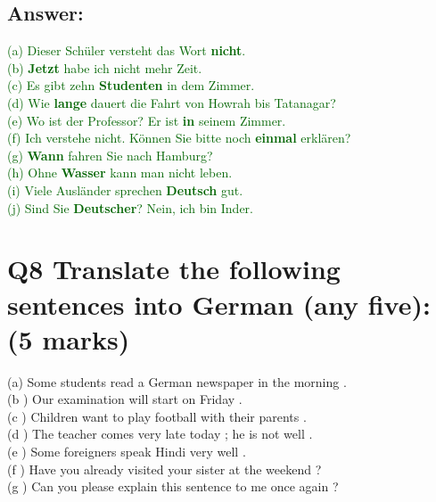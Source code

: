 \documentclass[a4paper,12pt]{article}
\begin{document}
\subsection*{Answer:}
\textcolor{darkgreen}{(a) Dieser Schüler versteht das Wort \textbf{nicht}.}\\
\textcolor{darkgreen}{(b) \textbf{Jetzt} habe ich nicht mehr Zeit.}\\
\textcolor{darkgreen}{(c) Es gibt zehn \textbf{Studenten} in dem Zimmer.}\\
\textcolor{darkgreen}{(d) Wie \textbf{lange} dauert die Fahrt von Howrah bis Tatanagar?}\\
\textcolor{darkgreen}{(e) Wo ist der Professor? Er ist \textbf{in} seinem Zimmer.}\\
\textcolor{darkgreen}{(f) Ich verstehe nicht. Können Sie bitte noch \textbf{einmal} erklären?}\\
\textcolor{darkgreen}{(g) \textbf{Wann} fahren Sie nach Hamburg?}\\
\textcolor{darkgreen}{(h) Ohne \textbf{Wasser} kann man nicht leben.}\\
\textcolor{darkgreen}{(i) Viele Ausländer sprechen \textbf{Deutsch} gut.}\\
\textcolor{darkgreen}{(j) Sind Sie \textbf{Deutscher}? Nein, ich bin Inder.}\\

\vspace{0.5cm}

\section*{Q8 Translate the following sentences into German (any five): (5 marks)}

(a) Some students read a German newspaper in the morning . \\
(b ) Our examination will start on Friday . \\
(c ) Children want to play football with their parents . \\
(d ) The teacher comes very late today ; he is not well . \\
(e ) Some foreigners speak Hindi very well . \\
(f ) Have you already visited your sister at the weekend ? \\
(g ) Can you please explain this sentence to me once again ?
\end{document}
